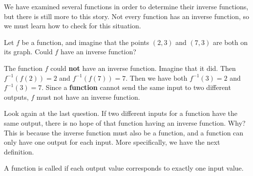 \documentclass{ximera}
\begin{document}
We have examined several functions in order to determine their inverse
functions, but there is still more to this story.  Not every function
has an inverse function, so we must learn how to check for this
situation.


\begin{question}
  Let $f$ be a function, and imagine that the points $(2,3)$ and
  $(7,3)$ are both on its graph.  Could $f$ have an inverse function?
  \begin{prompt}
  \begin{multipleChoice}
  \end{multipleChoice}
  \begin{feedback}
    The function $f$ could \textbf{not} have an inverse function.
    Imagine that it did.  Then $f^{-1}(f(2)) = 2$ and $f^{-1}(f(7)) =
    7$.  Then we have both $f^{-1}(3) = 2$ and $f^{-1}(3) = 7$.  Since
    a \textbf{function} cannot send the same input to two different
    outputs, $f$ must not have an inverse function.
  \end{feedback}
  \end{prompt}
\end{question}


Look again at the last question.  If two different inputs for a
function have the same output, there is no hope of that function
having an inverse function.  Why?  This is because the inverse
function must also be a function, and a function can only have one
output for each input.  More specifically, we have the next
definition.

\begin{definition}
A function is called  if each output value corresponds
to exactly one input value.
\end{definition}
\end{document}
